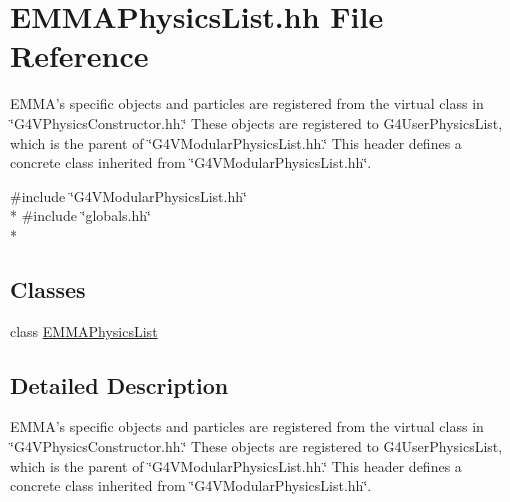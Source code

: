 \hypertarget{EMMAPhysicsList_8hh}{\section{E\-M\-M\-A\-Physics\-List.\-hh File Reference}
\label{EMMAPhysicsList_8hh}
}


E\-M\-M\-A's specific objects and particles are registered from the virtual class in \char`\"{}\-G4\-V\-Physics\-Constructor.\-hh.\char`\"{} These objects are registered to G4\-User\-Physics\-List, which is the parent of \char`\"{}\-G4\-V\-Modular\-Physics\-List.\-hh.\char`\"{} This header defines a concrete class inherited from \char`\"{}\-G4\-V\-Modular\-Physics\-List.\-hh\char`\"{}.  


{\ttfamily \#include \char`\"{}G4\-V\-Modular\-Physics\-List.\-hh\char`\"{}}\\*
{\ttfamily \#include \char`\"{}globals.\-hh\char`\"{}}\\*
\subsection*{Classes}
\begin{DoxyCompactItemize}
\item 
class \hyperlink{classEMMAPhysicsList}{E\-M\-M\-A\-Physics\-List}
\end{DoxyCompactItemize}


\subsection{Detailed Description}
E\-M\-M\-A's specific objects and particles are registered from the virtual class in \char`\"{}\-G4\-V\-Physics\-Constructor.\-hh.\char`\"{} These objects are registered to G4\-User\-Physics\-List, which is the parent of \char`\"{}\-G4\-V\-Modular\-Physics\-List.\-hh.\char`\"{} This header defines a concrete class inherited from \char`\"{}\-G4\-V\-Modular\-Physics\-List.\-hh\char`\"{}. 